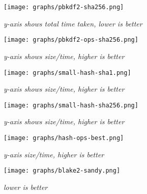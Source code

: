 \begin{figure}[!ht]
\centering
\texttt{[image: graphs/pbkdf2-sha256.png]}
\caption{\small \sl y-axis shows total time taken, lower is better
\label{fig:pbkdf2-sha256}}
\end{figure}

\begin{figure}[!ht]
\centering
\texttt{[image: graphs/pbkdf2-ops-sha256.png]}
\caption{\small \sl y-axis shows size/time, higher is better
\label{fig:pbkdf2-ops-sha256}}
\end{figure}

\begin{figure}[!ht]
\centering
\texttt{[image: graphs/small-hash-sha1.png]}
\caption{\small \sl y-axis shows size/time, higher is better
\label{fig:small-hash-sha1}}
\end{figure}

\begin{figure}[!ht]
\centering
\texttt{[image: graphs/small-hash-sha256.png]}
\caption{\small \sl y-axis shows size/time, higher is better
\label{fig:small-hash-sha256}}
\end{figure}

\begin{figure}[!ht]
\centering
\texttt{[image: graphs/hash-ops-best.png]}
\caption{\small \sl y-axis size/time, higher is better
\label{fig:hash-ops-best}}
\end{figure} 

\begin{figure}[!ht]
\centering
\texttt{[image: graphs/blake2-sandy.png]}
\caption{\small \sl lower is better
\label{fig:blake2-sandy}}
\end{figure}

